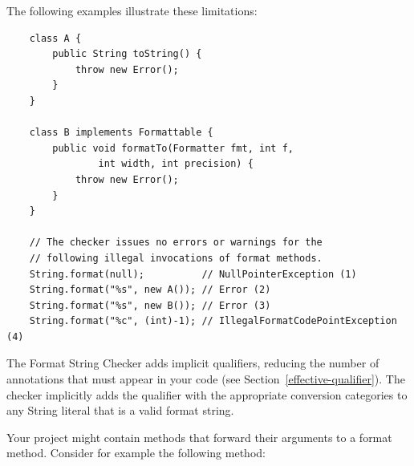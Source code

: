 \noindent The following examples illustrate these limitations:

\begin{Verbatim}
    class A {
        public String toString() {
            throw new Error();
        }
    }

    class B implements Formattable {
        public void formatTo(Formatter fmt, int f,
                int width, int precision) {
            throw new Error();
        }
    }

    // The checker issues no errors or warnings for the
    // following illegal invocations of format methods.
    String.format(null);          // NullPointerException (1)
    String.format("%s", new A()); // Error (2)
    String.format("%s", new B()); // Error (3)
    String.format("%c", (int)-1); // IllegalFormatCodePointException (4)
\end{Verbatim}

%
%



The Format String Checker adds implicit
qualifiers, reducing the number of annotations that must appear in your code
(see Section~\ref{effective-qualifier}).
The checker implicitly adds the  qualifier with the appropriate
conversion categories to any String literal that is a valid format string.



Your project might contain methods that forward their arguments to a format method.
Consider for example the following  method:

